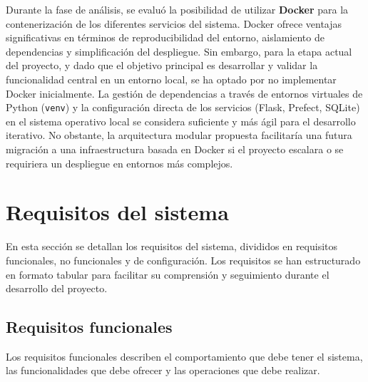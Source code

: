 Durante la fase de análisis, se evaluó la posibilidad de utilizar \textbf{Docker} para la contenerización de los diferentes servicios del sistema. Docker ofrece ventajas significativas en términos de reproducibilidad del entorno, aislamiento de dependencias y simplificación del despliegue. Sin embargo, para la etapa actual del proyecto, y dado que el objetivo principal es desarrollar y validar la funcionalidad central en un entorno local, se ha optado por no implementar Docker inicialmente. La gestión de dependencias a través de entornos virtuales de Python (\texttt{venv}) y la configuración directa de los servicios (Flask, Prefect, SQLite) en el sistema operativo local se considera suficiente y más ágil para el desarrollo iterativo. No obstante, la arquitectura modular propuesta facilitaría una futura migración a una infraestructura basada en Docker si el proyecto escalara o se requiriera un despliegue en entornos más complejos.

\section{Requisitos del sistema}
En esta sección se detallan los requisitos del sistema, divididos en requisitos funcionales, no funcionales y de configuración. Los requisitos se han estructurado en formato tabular para facilitar su comprensión y seguimiento durante el desarrollo del proyecto.

\subsection{Requisitos funcionales}
Los requisitos funcionales describen el comportamiento que debe tener el sistema, las funcionalidades que debe ofrecer y las operaciones que debe realizar.

